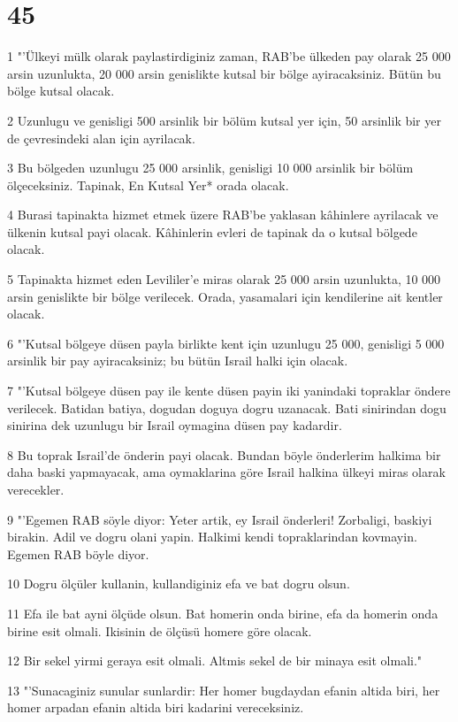 \chapter{45}

\par 1 "'Ülkeyi mülk olarak paylastirdiginiz zaman, RAB'be ülkeden pay olarak 25 000 arsin uzunlukta, 20 000 arsin genislikte kutsal bir bölge ayiracaksiniz. Bütün bu bölge kutsal olacak.
\par 2 Uzunlugu ve genisligi 500 arsinlik bir bölüm kutsal yer için, 50 arsinlik bir yer de çevresindeki alan için ayrilacak.
\par 3 Bu bölgeden uzunlugu 25 000 arsinlik, genisligi 10 000 arsinlik bir bölüm ölçeceksiniz. Tapinak, En Kutsal Yer* orada olacak.
\par 4 Burasi tapinakta hizmet etmek üzere RAB'be yaklasan kâhinlere ayrilacak ve ülkenin kutsal payi olacak. Kâhinlerin evleri de tapinak da o kutsal bölgede olacak.
\par 5 Tapinakta hizmet eden Levililer'e miras olarak 25 000 arsin uzunlukta, 10 000 arsin genislikte bir bölge verilecek. Orada, yasamalari için kendilerine ait kentler olacak.
\par 6 "'Kutsal bölgeye düsen payla birlikte kent için uzunlugu 25 000, genisligi 5 000 arsinlik bir pay ayiracaksiniz; bu bütün Israil halki için olacak.
\par 7 "'Kutsal bölgeye düsen pay ile kente düsen payin iki yanindaki topraklar öndere verilecek. Batidan batiya, dogudan doguya dogru uzanacak. Bati sinirindan dogu sinirina dek uzunlugu bir Israil oymagina düsen pay kadardir.
\par 8 Bu toprak Israil'de önderin payi olacak. Bundan böyle önderlerim halkima bir daha baski yapmayacak, ama oymaklarina göre Israil halkina ülkeyi miras olarak verecekler.
\par 9 "'Egemen RAB söyle diyor: Yeter artik, ey Israil önderleri! Zorbaligi, baskiyi birakin. Adil ve dogru olani yapin. Halkimi kendi topraklarindan kovmayin. Egemen RAB böyle diyor.
\par 10 Dogru ölçüler kullanin, kullandiginiz efa ve bat dogru olsun.
\par 11 Efa ile bat ayni ölçüde olsun. Bat homerin onda birine, efa da homerin onda birine esit olmali. Ikisinin de ölçüsü homere göre olacak.
\par 12 Bir sekel yirmi geraya esit olmali. Altmis sekel de bir minaya esit olmali."
\par 13 "'Sunacaginiz sunular sunlardir: Her homer bugdaydan efanin altida biri, her homer arpadan efanin altida biri kadarini vereceksiniz.
